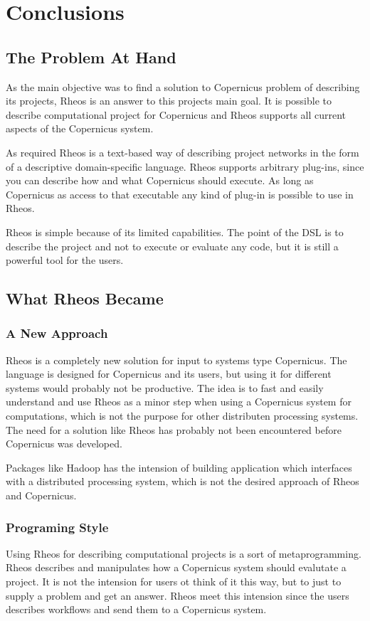 \chapter{Conclusions}

\section{The Problem At Hand}
As the main objective was to find a solution to Copernicus problem of
describing its projects, Rheos is an answer to this projects main
goal. It is possible to describe computational project for Copernicus
and Rheos supports all current aspects of the Copernicus system.

As required Rheos is a text-based way of describing project networks
in the form of a descriptive domain-specific language. Rheos supports
arbitrary plug-ins, since you can describe how and what Copernicus
should execute. As long as Copernicus as access to that executable any
kind of plug-in is possible to use in Rheos.

Rheos is simple because of its limited capabilities. The point of the
DSL is to describe the project and not to execute or evaluate any
code, but it is still a powerful tool for the users.


\section{What Rheos Became}

\subsection{A New Approach}
Rheos is a completely new solution for input to systems type
Copernicus. The language is designed for Copernicus and its users, but
using it for different systems would probably not be productive. The
idea is to fast and easily understand and use Rheos as a minor step
when using a Copernicus system for computations, which is not the
purpose for other distributen processing systems. The need for a
solution like Rheos has probably not been encountered before
Copernicus was developed.

Packages like Hadoop has the intension of building application which
interfaces with a distributed processing system, which is not the
desired approach of Rheos and Copernicus.

\subsection{Programing Style}
Using Rheos for describing computational projects is a sort of
metaprogramming. Rheos describes and manipulates how a Copernicus
system should evalutate a project. It is not the intension for users
ot think of it this way, but to just to supply a problem and get an
answer. Rheos meet this intension since the users describes workflows
and send them to a Copernicus system.

